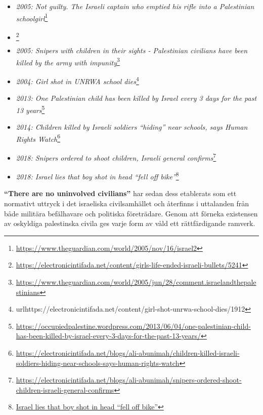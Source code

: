 \begin{itemize}
    \item \textit{2005: Not guilty. The Israeli captain who emptied his rifle into a Palestinian schoolgirl}\footnote{\url{https://www.theguardian.com/world/2005/nov/16/israel2}}
    
    \item {}\footnote{\url{https://electronicintifada.net/content/girls-life-ended-israeli-bullets/5241}}

    \item \textit{2005: Snipers with children in their sights - Palestinian civilians have been killed by the army with impunity}\footnote{\url{https://www.theguardian.com/world/2005/jun/28/comment.israelandthepalestinians}}

    \item \textit{2004: Girl shot in UNRWA school dies}\footnote{url{https://electronicintifada.net/content/girl-shot-unrwa-school-dies/1912}}

    \item \textit{2013: One Palestinian child has been killed by Israel every 3 days for the past 13 years}\footnote{\url{https://occupiedpalestine.wordpress.com/2013/06/04/one-palestinian-child-has-been-killed-by-israel-every-3-days-for-the-past-13-years/}}

    \item \textit{2014: Children killed by Israeli soldiers “hiding” near schools, says Human Rights Watch}\footnote{\url{https://electronicintifada.net/blogs/ali-abunimah/children-killed-israeli-soldiers-hiding-near-schools-says-human-rights-watch}}
    
    \item \textit{2018: Snipers ordered to shoot children, Israeli general confirms}\footnote{\url{https://electronicintifada.net/blogs/ali-abunimah/snipers-ordered-shoot-children-israeli-general-confirms}}
    
    \item \textit{2018: Israel lies that boy shot in head “fell off bike”}\footnote{\url{Israel lies that boy shot in head “fell off bike”}}

\end{itemize}


\textbf{“There are no uninvolved civilians”} har sedan dess etablerats som ett normativt uttryck i det israeliska civilsamhället och återfinns i uttalanden från både militära befälhavare och politiska företrädare. Genom att förneka existensen av oskyldiga palestinska civila ges varje form av våld ett rättfärdigande ramverk.

